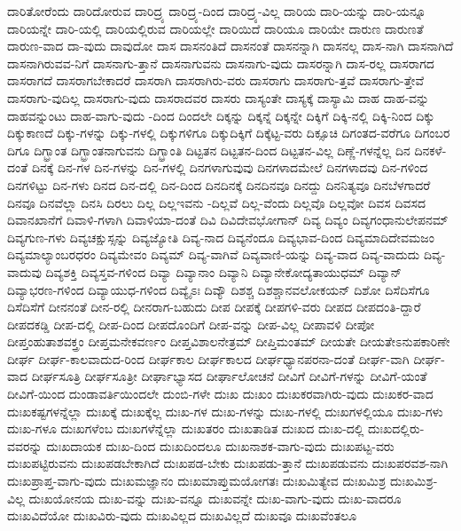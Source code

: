 {ದಾರಿತೋರೆಂದು
ದಾರಿದೋರುವ
ದಾರಿದ್ರ್ಯ
ದಾರಿದ್ರ್ಯ-ದಿಂದ
ದಾರಿದ್ರ್ಯ-ವಿಲ್ಲ
ದಾರಿಯ
ದಾರಿ-ಯನ್ನು
ದಾರಿ-ಯನ್ನೂ
ದಾರಿಯನ್ನೇ
ದಾರಿ-ಯಲ್ಲಿ
ದಾರಿಯಲ್ಲಿರುವ
ದಾರಿಯಲ್ಲೇ
ದಾರಿಯಿದೆ
ದಾರಿಯೂ
ದಾರಿಯೇ
ದಾರುಣ
ದಾರುಣತೆ
ದಾರುಣ-ವಾದ
ದಾ-ವುದು
ದಾವುದೋ
ದಾಸ
ದಾಸನಂತಿದೆ
ದಾಸನಂತೆ
ದಾಸನನ್ನಾಗಿ
ದಾಸನಲ್ಲ
ದಾಸ-ನಾಗಿ
ದಾಸನಾಗಿದೆ
ದಾಸನಾಗಿರುವವ-ನಿಗೆ
ದಾಸನಾಗು-ತ್ತಾನೆ
ದಾಸನಾಗುವನು
ದಾಸನಾಗು-ವುದು
ದಾಸರನ್ನಾಗಿ
ದಾಸ-ರಲ್ಲ
ದಾಸರಾಗದ
ದಾಸರಾಗದೆ
ದಾಸರಾಗಬೇಕಾದರೆ
ದಾಸರಾಗಿ
ದಾಸರಾಗಿರು-ವರು
ದಾಸರಾಗು
ದಾಸರಾಗು-ತ್ತವೆ
ದಾಸರಾಗು-ತ್ತೇವೆ
ದಾಸರಾಗು-ವುದಿಲ್ಲ
ದಾಸರಾಗು-ವುದು
ದಾಸರಾದವರ
ದಾಸರು
ದಾಸ್ಯಂತೇ
ದಾಸ್ಯಕ್ಕೆ
ದಾಸ್ಯಾಮಿ
ದಾಹ
ದಾಹ-ವನ್ನು
ದಾಹವನ್ನುಂಟು
ದಾಹ-ವಾಗು-ವುದು
-ದಿಂದ
ದಿಂದಲೇ
ದಿಕ್ಕನ್ನು
ದಿಕ್ಕನ್ನೆ
ದಿಕ್ಕನ್ನೇ
ದಿಕ್ಕಿಗೆ
ದಿಕ್ಕಿ-ನಲ್ಲಿ
ದಿಕ್ಕಿ-ನಿಂದ
ದಿಕ್ಕು
ದಿಕ್ಕುಕಾಣದೆ
ದಿಕ್ಕು-ಗಳನ್ನು
ದಿಕ್ಕು-ಗಳಲ್ಲಿ
ದಿಕ್ಕುಗಳಿಗೂ
ದಿಕ್ಕುದಿಕ್ಕಿಗೆ
ದಿಕ್ಕೆಟ್ಟ-ವರು
ದಿಕ್ಸೂಚಿ
ದಿಗಂತದ-ವರೆಗೂ
ದಿಗಂಬರ
ದಿಗೂ
ದಿಗ್ಭ್ರಾಂತ
ದಿಗ್ಭ್ರಾಂತನಾಗುವನು
ದಿಗ್ಭ್ರಾಂತಿ
ದಿಟ್ಟತನ
ದಿಟ್ಟತನ-ದಿಂದ
ದಿಟ್ಟತನ-ವಿಲ್ಲ
ದಿಣ್ಣೆ-ಗಳನ್ನೆಲ್ಲ
ದಿನ
ದಿನಕಳೆ-ದಂತೆ
ದಿನಕ್ಕೆ
ದಿನ-ಗಳ
ದಿನ-ಗಳನ್ನು
ದಿನ-ಗಳಲ್ಲಿ
ದಿನಗಳಾಗುವುವು
ದಿನಗಳಾದಮೇಲೆ
ದಿನಗಳಾದವು
ದಿನ-ಗಳಿಂದ
ದಿನಗಳಿಟ್ಟು
ದಿನ-ಗಳು
ದಿನದ
ದಿನ-ದಲ್ಲಿ
ದಿನ-ದಿಂದ
ದಿನದಿನಕ್ಕೆ
ದಿನದಿನವೂ
ದಿನದ್ದು
ದಿನನಿತ್ಯವೂ
ದಿನಬೆಳಗಾದರೆ
ದಿನವೂ
ದಿನವೆಲ್ಲಾ
ದಿನಸಿ
ದಿರಲು
ದಿಲ್ಲ
ದಿಲ್ಲಇವನು
-ದಿಲ್ಲವೆ
ದಿಲ್ಲ-ವೆಂದು
ದಿಲ್ಲವೊ
ದಿಲ್ಲವೋ
ದಿವಸ
ದಿವಸದ
ದಿವಾನಖಾನೆಗೆ
ದಿವಾಳಿ-ಗಳಾಗಿ
ದಿವಾಳಿಯಾ-ದಂತೆ
ದಿವಿ
ದಿವಿದೇವಭೋಗಾನ್
ದಿವ್ಯ
ದಿವ್ಯಂ
ದಿವ್ಯಗಂಧಾನುಲೇಪನಮ್
ದಿವ್ಯಗುಣ-ಗಳು
ದಿವ್ಯಚಕ್ಷುಸ್ಸನ್ನು
ದಿವ್ಯಜ್ಯೋತಿ
ದಿವ್ಯ-ನಾದ
ದಿವ್ಯನೆಂದೂ
ದಿವ್ಯಭಾವ-ದಿಂದ
ದಿವ್ಯಮಾದಿದೇವಮಜಂ
ದಿವ್ಯಮಾಲ್ಯಾಂಬರಧರಂ
ದಿವ್ಯಮೇವಂ
ದಿವ್ಯಮ್
ದಿವ್ಯ-ವಾಗಿವೆ
ದಿವ್ಯವಾಣಿ-ಯನ್ನು
ದಿವ್ಯ-ವಾದ
ದಿವ್ಯ-ವಾದುದು
ದಿವ್ಯ-ವಾದುವು
ದಿವ್ಯಶಕ್ತಿ
ದಿವ್ಯಸ್ತವ-ಗಳಿಂದ
ದಿವ್ಯಾ
ದಿವ್ಯಾನಾಂ
ದಿವ್ಯಾನಿ
ದಿವ್ಯಾನೇಕೋದ್ಯತಾಯುಧಮ್
ದಿವ್ಯಾನ್
ದಿವ್ಯಾಭರಣ-ಗಳಿಂದ
ದಿವ್ಯಾಯುಧ-ಗಳಿಂದ
ದಿವ್ಯೈಽಃ
ದಿವ್ಯೌ
ದಿಶಶ್ಚ
ದಿಶಶ್ಚಾನವಲೋಕಯನ್
ದಿಶೋ
ದಿಸೆದಿಸೆಗೂ
ದಿಸೆದಿಸೆಗೆ
ದೀನನಂತೆ
ದೀನ-ರಲ್ಲಿ
ದೀನರಾಗ-ಬಹುದು
ದೀಪ
ದೀಪಕ್ಕೆ
ದೀಪಗಳಿ-ವರು
ದೀಪದ
ದೀಪದಂತಿ-ದ್ದಾರೆ
ದೀಪದಕಡ್ಡಿ
ದೀಪ-ದಲ್ಲಿ
ದೀಪ-ದಿಂದ
ದೀಪದೊಂದಿಗೆ
ದೀಪ-ವನ್ನು
ದೀಪ-ವಿಲ್ಲ
ದೀಪಾವಳಿ
ದೀಪೋ
ದೀಪ್ತಂಹುತಾಶವಕ್ತ್ರಂ
ದೀಪ್ತಮನೇಕವರ್ಣಂ
ದೀಪ್ತವಿಶಾಲನೇತ್ರಮ್
ದೀಪ್ತಿಮಂತಮ್
ದೀಯತೇ
ದೀಯತೇಽನುಪಕಾರಿಣೇ
ದೀರ್ಘ
ದೀರ್ಘ-ಕಾಲವಾದುದ-ರಿಂದ
ದೀರ್ಘಕಾಲ
ದೀರ್ಘಕಾಲದ
ದೀರ್ಘಧ್ಯಾನಪರನಾ-ದಂತೆ
ದೀರ್ಘ-ವಾಗಿ
ದೀರ್ಘ-ವಾದ
ದೀರ್ಘಸೂತ್ರಿ
ದೀರ್ಘಸೂತ್ರೀ
ದೀರ್ಘಾಭ್ಯಾಸದ
ದೀರ್ಘಾಲೋಚನೆ
ದೀವಿಗೆ
ದೀವಿಗೆ-ಗಳನ್ನು
ದೀವಿಗೆ-ಯಂತೆ
ದೀವಿಗೆ-ಯಿಂದ
ದುಂಡಾವರ್ತಿಯಿಂದಲೇ
ದುಂಬಿ-ಗಳೇ
ದುಃಖ
ದುಃಖಂ
ದುಃಖಕರವಾಗಿರು-ವುದು
ದುಃಖಕರ-ವಾದ
ದುಃಖಕಷ್ಟಗಳನ್ನೆಲ್ಲಾ
ದುಃಖಕ್ಕೆ
ದುಃಖಕ್ಕೆಲ್ಲ
ದುಃಖ-ಗಳ
ದುಃಖ-ಗಳನ್ನು
ದುಃಖ-ಗಳಲ್ಲಿ
ದುಃಖಗಳಲ್ಲಿಯೂ
ದುಃಖ-ಗಳು
ದುಃಖ-ಗಳೂ
ದುಃಖಗಳೆಂಬ
ದುಃಖಗಳೆನ್ನೆಲ್ಲಾ
ದುಃಖತರಂ
ದುಃಖತಾಡಿತ
ದುಃಖದ
ದುಃಖ-ದಲ್ಲಿ
ದುಃಖದಲ್ಲಿರು-ವವರನ್ನು
ದುಃಖದಾಯಕ
ದುಃಖ-ದಿಂದ
ದುಃಖದಿಂದಲೂ
ದುಃಖನಾಶಕ-ವಾಗು-ವುದು
ದುಃಖಪಟ್ಟ-ವರು
ದುಃಖಪಟ್ಟಿರುವನು
ದುಃಖಪಡಬೇಕಾಗಿದೆ
ದುಃಖಪಡ-ಬೇಕು
ದುಃಖಪಡು-ತ್ತಾನೆ
ದುಃಖಪಡುವನು
ದುಃಖಪರವಶ-ನಾಗಿ
ದುಃಖಪ್ರಾಪ್ತ-ವಾಗು-ವುದು
ದುಃಖಮಜ್ಞಾನಂ
ದುಃಖಮಾಪ್ತುಮಯೋಗತಃ
ದುಃಖಮಿತ್ಯೇವ
ದುಃಖಮಿಶ್ರ
ದುಃಖಮಿಶ್ರ-ವಿಲ್ಲ
ದುಃಖಯೋನಯ
ದುಃಖ-ವನ್ನು
ದುಃಖ-ವನ್ನೂ
ದುಃಖವನ್ನೇ
ದುಃಖ-ವಾಗು-ವುದು
ದುಃಖ-ವಾದರೂ
ದುಃಖವಿದೆಯೋ
ದುಃಖವಿರು-ವುದು
ದುಃಖವಿಲ್ಲದ
ದುಃಖವಿಲ್ಲದೆ
ದುಃಖವೂ
ದುಃಖವೆಂತಲೂ
}
